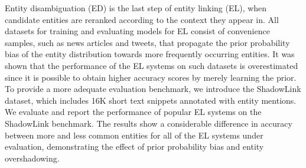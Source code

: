 Entity disambiguation (ED) is the last step of entity linking (EL), when candidate entities are reranked according to the context they appear in. All datasets for training and evaluating models for EL consist of convenience samples, such as news articles and tweets, that propagate the prior probability bias of the entity distribution towards more frequently occurring entities.  It was shown that the performance of the EL systems on such datasets is overestimated since it is possible to obtain higher accuracy scores by merely learning the prior. To provide a more adequate evaluation benchmark, we introduce the ShadowLink dataset, which includes 16K short text snippets annotated with entity mentions. We evaluate and report the performance of popular EL systems on the ShadowLink benchmark. The results show a considerable difference in accuracy between more and less common entities for all of the EL systems under evaluation, demonstrating the effect of prior probability bias and entity overshadowing.
